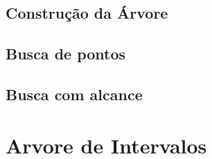 \subsection{Construção da Árvore}


\subsection{Busca de pontos}
\subsection{Busca com alcance}

\section{Arvore de Intervalos}



